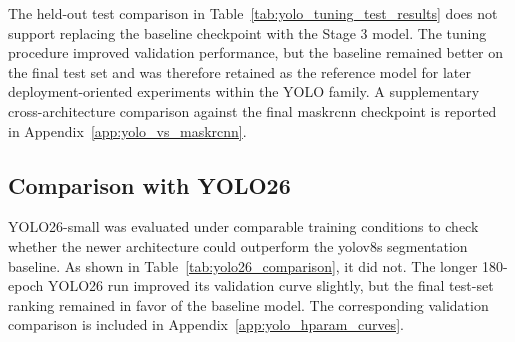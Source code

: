 \begin{table}[htbp]
    \centering
    \caption{Held-out test-set comparison between the baseline and the selected Stage 3 tuned \gls{yolo}v8s segmentation model.}
    \label{tab:yolo_tuning_test_results}
    \small
\end{table}

The held-out test comparison in Table~\ref{tab:yolo_tuning_test_results} does
not support replacing the baseline checkpoint with the Stage 3 model. The tuning
procedure improved validation performance, but the baseline remained better on
the final test set and was therefore retained as the reference model for later
deployment-oriented experiments within the YOLO family. A supplementary
cross-architecture comparison against the final \gls{maskrcnn} checkpoint is
reported in Appendix~\ref{app:yolo_vs_maskrcnn}.

\subsection{Comparison with YOLO26}

YOLO26-small was evaluated under comparable training conditions to check whether
the newer architecture could outperform the \gls{yolo}v8s segmentation baseline. As shown
in Table~\ref{tab:yolo26_comparison}, it did not. The longer 180-epoch YOLO26
run improved its validation curve slightly, but the final test-set ranking
remained in favor of the baseline model. The corresponding validation comparison
is included in Appendix~\ref{app:yolo_hparam_curves}.

